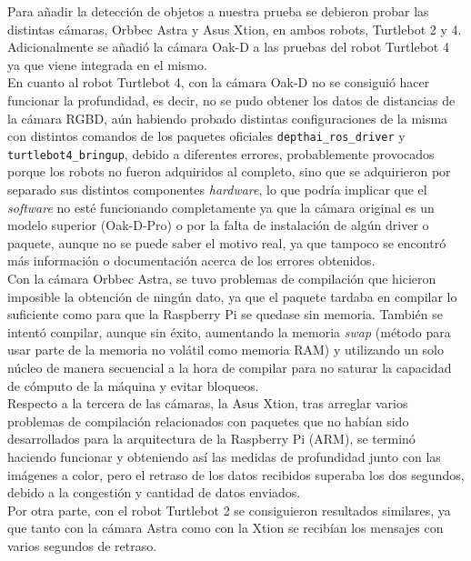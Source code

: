 Para añadir la detección de objetos a nuestra prueba se debieron probar las
distintas cámaras, Orbbec Astra y Asus Xtion, en ambos robots, Turtlebot 2 y 4.
Adicionalmente se añadió la cámara Oak-D a las pruebas del robot Turtlebot 4 ya
que viene integrada en el mismo.
\\

En cuanto al robot Turtlebot 4, con la cámara Oak-D no se consiguió
hacer funcionar la profundidad, es decir, no se pudo obtener los datos de
distancias de la cámara RGBD, aún habiendo probado distintas configuraciones de
la misma con distintos comandos de los paquetes oficiales
\texttt{depthai\_ros\_driver} y \texttt{turtlebot4\_bringup}, debido a
diferentes errores, probablemente provocados porque los robots no fueron
adquiridos al completo, sino que se adquirieron por separado sus distintos
componentes \textit{hardware}, lo que podría implicar que el \textit{software}
no esté funcionando completamente ya que la cámara original es un modelo
superior (Oak-D-Pro) o por la falta de instalación de algún driver o paquete,
aunque no se puede saber el motivo real, ya que tampoco se encontró más
información o documentación acerca de los errores obtenidos.
\\

Con la cámara Orbbec Astra, se tuvo problemas de compilación que hicieron
imposible la obtención de ningún dato, ya que el paquete tardaba en compilar lo
suficiente como para que la Raspberry Pi se quedase sin memoria.
También se intentó compilar, aunque sin éxito, aumentando la memoria
\textit{swap} (método para usar parte de la memoria no volátil como memoria RAM)
y utilizando un solo núcleo de manera secuencial a la hora de compilar para no
saturar la capacidad de cómputo de la máquina y evitar bloqueos.
\\

Respecto a la tercera de las cámaras, la Asus Xtion, tras arreglar varios
problemas de compilación relacionados con paquetes que no habían sido
desarrollados para la arquitectura de la Raspberry Pi (ARM), se terminó haciendo
funcionar y obteniendo así las medidas de profundidad junto con las imágenes a
color, pero el retraso de los datos recibidos superaba los dos segundos, debido
a la congestión y cantidad de datos enviados.
\\

Por otra parte, con el robot Turtlebot 2 se consiguieron resultados similares,
ya que tanto con la cámara Astra como con la Xtion se recibían los mensajes con
varios segundos de retraso.
\\

